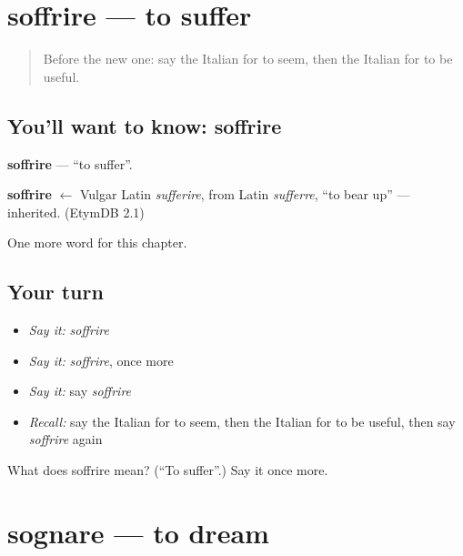 \section[soffrire]{soffrire — to suffer}

\label{lesson:IT-C211-soffrire}



\begin{quote}
Before the new one: say the Italian for to seem, then the Italian for to be useful.
\end{quote}

\subsection*{You'll want to know: soffrire}
\textbf{soffrire} — \textquotedblleft{}to suffer\textquotedblright{}.

\begin{cousinweb}
\textbf{soffrire} $\leftarrow$ Vulgar Latin \emph{sufferire}, from Latin \emph{sufferre}, \textquotedblleft{}to bear up\textquotedblright{} — inherited. (EtymDB 2.1)
\end{cousinweb}

\begin{grammarlens}[title={What you've built}]
One more word for this chapter.
\end{grammarlens}

\subsection*{Your turn}
\begin{itemize}
\raggedright
  \item \emph{Say it:} \emph{soffrire}
  \item \emph{Say it:} \emph{soffrire}, once more
  \item \emph{Say it:} say \emph{soffrire}
  \item \emph{Recall:} say the Italian for to seem, then the Italian for to be useful, then say \emph{soffrire} again
\end{itemize}

\begin{tcolorbox}[breakable,colback=teal!4,colframe=teal!35!black,title={Before you move on}]
What does soffrire mean? (\textquotedblleft{}To suffer\textquotedblright{}.) Say it once more.
\end{tcolorbox}
\section[sognare]{sognare — to dream}

